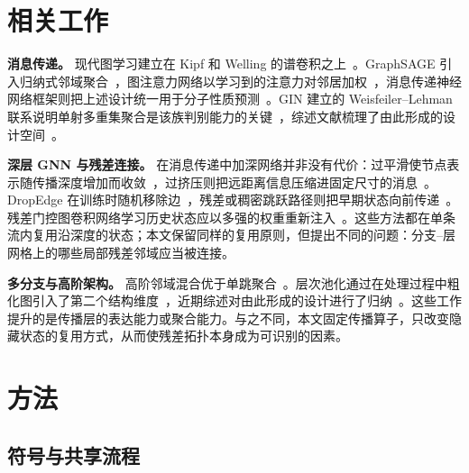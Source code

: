 \documentclass[9pt,twocolumn]{extarticle}
\begin{document}
\section{相关工作}
\label{sec:related-zh}

\textbf{消息传递。} 现代图学习建立在 Kipf 和 Welling 的谱卷积之上~\cite{kipf2017gcn}。GraphSAGE 引入归纳式邻域聚合~\cite{hamilton2017inductive}，图注意力网络以学习到的注意力对邻居加权~\cite{velivckovic2017graph}，消息传递神经网络框架则把上述设计统一用于分子性质预测~\cite{gilmer2017neural}。GIN 建立的 Weisfeiler--Lehman 联系说明单射多重集聚合是该族判别能力的关键~\cite{xu2019gin}，综述文献梳理了由此形成的设计空间~\cite{wu2020comprehensive}。

\textbf{深层 GNN 与残差连接。} 在消息传递中加深网络并非没有代价：过平滑使节点表示随传播深度增加而收敛~\cite{li2018deeper}，过挤压则把远距离信息压缩进固定尺寸的消息~\cite{alon2020bottleneck,topping2021understanding}。DropEdge 在训练时随机移除边~\cite{rong2019dropedge}，残差或稠密跳跃路径则把早期状态向前传递~\cite{he2016deep}。残差门控图卷积网络学习历史状态应以多强的权重重新注入~\cite{bresson2017residual}。这些方法都在单条流内复用沿深度的状态；本文保留同样的复用原则，但提出不同的问题：分支--层网格上的哪些局部残差邻域应当被连接。

\textbf{多分支与高阶架构。} 高阶邻域混合优于单跳聚合~\cite{abu2019mixhop}。层次池化通过在处理过程中粗化图引入了第二个结构维度~\cite{ying2018hierarchical}，近期综述对由此形成的设计进行了归纳~\cite{li2024graph}。这些工作提升的是传播层的表达能力或聚合能力。与之不同，本文固定传播算子，只改变隐藏状态的复用方式，从而使残差拓扑本身成为可识别的因素。

\section{方法}
\label{sec:method-zh}

\subsection{符号与共享流程}
\label{sec:pipeline-zh}
\end{document}
